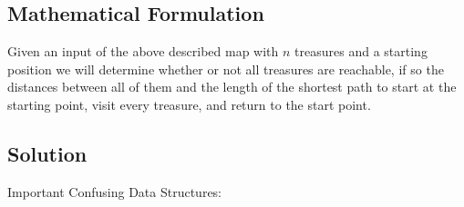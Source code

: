 \documentclass[12pt]{article}
\begin{document}


\subsection{Mathematical Formulation}
Given an input of the above described map with $n$ treasures and a starting position we will
determine whether or not all treasures are reachable, if so the distances between all of them
and the length of the shortest path to start at the starting point, visit every treasure, and
return to the start point.


\subsection{Solution}
Important Confusing Data Structures:
\end{document}
